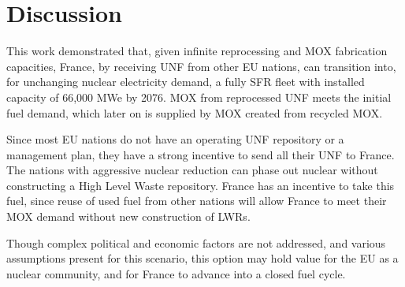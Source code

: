 \section{Discussion}
This work demonstrated that, given infinite
reprocessing and \gls{MOX} fabrication capacities,
France, by receiving \gls{UNF} from other \gls{EU} nations,
 can transition into, for unchanging nuclear electricity demand,
a fully \gls{SFR} fleet
with installed capacity of 66,000 MWe by 2076.
\gls{MOX} from reprocessed \gls{UNF} meets the initial fuel demand,
which later on is supplied by \gls{MOX} created from recycled \gls{MOX}.

Since most \gls{EU} nations do not have an operating \gls{UNF}
repository or a management plan, they have a strong incentive
to send all their \gls{UNF} to France. The nations
with aggressive nuclear reduction can phase out nuclear
without constructing a High Level Waste repository. France has an
incentive to take this fuel, since reuse of used fuel from
other nations will allow France to meet their MOX demand
without new construction of \glspl{LWR}.

Though complex political and economic factors are not
addressed, and various assumptions present for this scenario,
this option may hold value for the \gls{EU} as a nuclear community,
and for France to advance into a closed fuel cycle.
